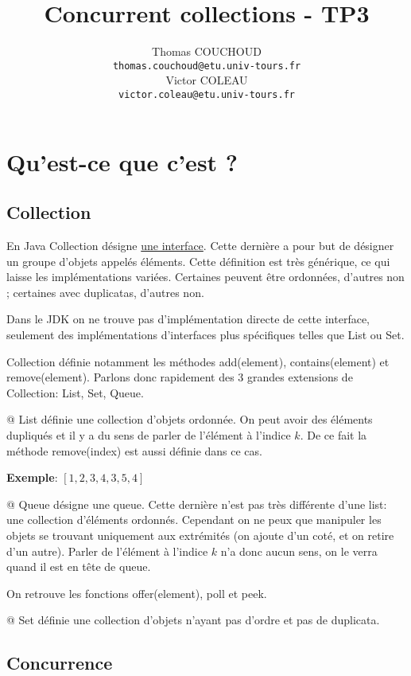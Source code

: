 \documentclass{report}
\title{Concurrent collections - TP3}
\author{Thomas COUCHOUD\\\texttt{thomas.couchoud@etu.univ-tours.fr}\\Victor COLEAU\\\texttt{victor.coleau@etu.univ-tours.fr}}
\begin{document}
	\mccTitle
	
	\chapter{Qu'est-ce que c'est ?}
		\section{Collection}
			En Java Collection désigne \href{https://docs.oracle.com/javase/8/docs/api/java/util/Collection.html}{une interface}.
			Cette dernière a pour but de désigner un groupe d'objets appelés éléments.
			Cette définition est très générique, ce qui laisse les implémentations variées.
			Certaines peuvent être ordonnées, d'autres non ; certaines avec duplicatas, d'autres non.
			
			Dans le JDK on ne trouve pas d'implémentation directe de cette interface, seulement des implémentations d'interfaces plus spécifiques telles que List ou Set.
			
			
			
			Collection définie notamment les méthodes add(element), contains(element) et remove(element).
			Parlons donc rapidement des 3 grandes extensions de Collection: List, Set, Queue.
			\begin{easylist}[itemize]
				@ List définie une collection d'objets ordonnée.
				On peut avoir des éléments dupliqués et il y a du sens de parler de l'élément à l'indice $k$.
				De ce fait la méthode remove(index) est aussi définie dans ce cas.
			
				\textbf{Exemple}: $\left[1,2,3,4,3,5,4\right]$
				
				@ Queue désigne une queue. Cette dernière n'est pas très différente d'une list: une collection d'éléments ordonnés.
				Cependant on ne peux que manipuler les objets se trouvant uniquement aux extrémités (on ajoute d'un coté, et on retire d'un autre).
				Parler de l'élément à l'indice $k$ n'a donc aucun sens, on le verra quand il est en tête de queue.
				
				On retrouve les fonctions offer(element), poll et peek.
				
				@ Set définie une collection d'objets n'ayant pas d'ordre et pas de duplicata.
			\end{easylist}
			
		\section{Concurrence}
			
			
\end{document}
